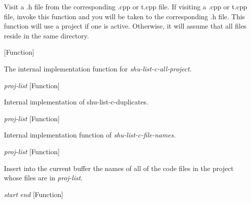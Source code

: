 \begin{doc-string}
Visit a .h file from the corresponding .cpp or t.cpp file.  If visiting a
.cpp or t.cpp file, invoke this function and you will be taken to the
corresponding .h file.  This function will use a project if one is active.
Otherwise, it will assume that all files reside in the same directory.
\end{doc-string}

\vspace{1em}
\noindent
{}
\usebox{\funcname}
 \hfill [Function]

\begin{doc-string}
The internal implementation function for \emph{shu-list-c-all-project}.
\end{doc-string}

\vspace{1em}
\noindent
{}
\usebox{\funcname}\emph{proj-list}
 \hfill [Function]

\begin{doc-string}
Internal implementation of shu-list-c-duplicates.
\end{doc-string}

\vspace{1em}
\noindent
{}
\usebox{\funcname}\emph{proj-list}
 \hfill [Function]

\begin{doc-string}
Internal implementation function of \emph{shu-list-c-file-names}.
\end{doc-string}

\vspace{1em}
\noindent
{}
\usebox{\funcname}\emph{proj-list}
 \hfill [Function]

\begin{doc-string}
Insert into the current buffer the names of all of the code files in the
project whose files are in \emph{proj-list}.
\end{doc-string}

\vspace{1em}
\noindent
{}
\usebox{\funcname}\emph{start} \emph{end}
 \hfill [Function]

